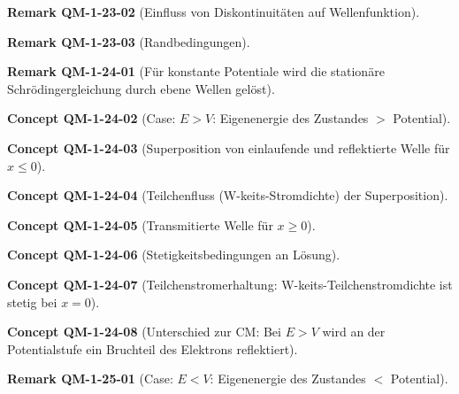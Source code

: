 \documentclass[10pt, letterpaper]{article}
\newcommand{\CustomHeading}[3]{%
  \par\medskip\noindent%
  \textbf{#1 #2} \textnormal{(#3)}.\enskip%
}
\newenvironment{REM}[2]{\CustomHeading{Remark}{#1}{#2}}{}
\newenvironment{CONC}[2]{\CustomHeading{Concept}{#1}{#2}}{}
\begin{document}
\begin{REM}{QM-1-23-02}{Einfluss von Diskontinuitäten auf Wellenfunktion}
\end{REM}

\begin{REM}{QM-1-23-03}{Randbedingungen}
\end{REM}

\begin{REM}{QM-1-24-01}{Für konstante Potentiale wird die stationäre Schrödingergleichung durch ebene Wellen gelöst}
\end{REM}

\begin{CONC}{QM-1-24-02}{Case: $E>V$: Eigenenergie des Zustandes $>$ Potential}
\end{CONC}

\begin{CONC}{QM-1-24-03}{Superposition von einlaufende und reflektierte Welle für $x\leq 0$}
\end{CONC}

\begin{CONC}{QM-1-24-04}{Teilchenfluss (W-keits-Stromdichte) der Superposition}
\end{CONC}

\begin{CONC}{QM-1-24-05}{Transmitierte Welle für $x\geq 0$}
\end{CONC}

\begin{CONC}{QM-1-24-06}{Stetigkeitsbedingungen an Lösung}
\end{CONC}

\begin{CONC}{QM-1-24-07}{Teilchenstromerhaltung: W-keits-Teilchenstromdichte ist stetig bei $x=0$}
\end{CONC}

\begin{CONC}{QM-1-24-08}{Unterschied zur CM: Bei $E>V$ wird an der Potentialstufe ein Bruchteil des Elektrons reflektiert}
\end{CONC}

\begin{REM}{QM-1-25-01}{Case: $E<V$: Eigenenergie des Zustandes $<$ Potential}
\end{REM}
\end{document}

